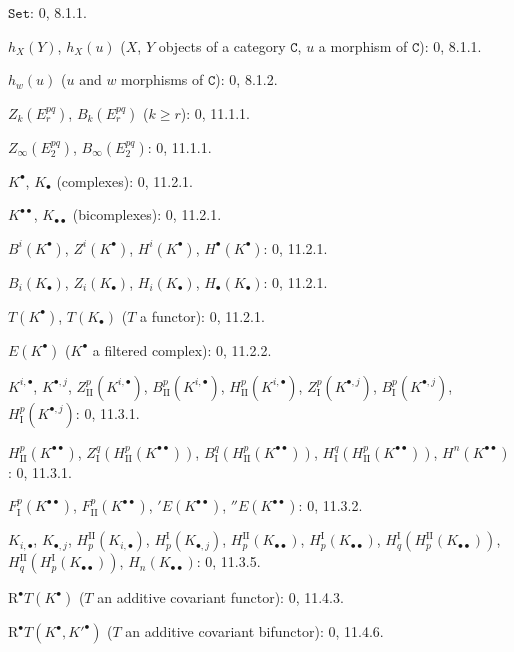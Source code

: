 \documentclass[oneside]{amsart}
\theoremstyle{ega-env-style}
\theoremstyle{ega-thm-env-style}
\theoremstyle{ega-defn-env-style}
\def\cat{\mathtt}                   %
\def\geq{\geqslant}                 %
\def\RR{\mathrm{R}}                 %
\def\C{\cat{C}}                     %
\def\Set{\cat{Set}}                 %
\begin{document}
\begin{flushleft}
$\Set$: 0, 8.1.1.

$h_X(Y)$, $h_X(u)$ ($X$, $Y$ objects of a category $\C$, $u$ a morphism
of $\C$): 0, 8.1.1.

$h_w(u)$ ($u$ and $w$ morphisms of $\C$): 0, 8.1.2.

$Z_k(E_r^{pq})$, $B_k(E_r^{pq})$ ($k\geq r$): 0, 11.1.1.

$Z_\infty(E_2^{pq})$, $B_\infty(E_2^{pq})$: 0, 11.1.1.

$K^\bullet$, $K_\bullet$ (complexes): 0, 11.2.1.

$K^{\bullet\bullet}$, $K_{\bullet\bullet}$ (bicomplexes): 0, 11.2.1.

$B^i(K^\bullet)$, $Z^i(K^\bullet)$, $H^i(K^\bullet)$,
$H^\bullet(K^\bullet)$: 0, 11.2.1.

$B_i(K_\bullet)$, $Z_i(K_\bullet)$, $H_i(K_\bullet)$,
$H_\bullet(K_\bullet)$: 0, 11.2.1.

$T(K^\bullet)$, $T(K_\bullet)$ ($T$ a functor): 0, 11.2.1.

$E(K^\bullet)$ ($K^\bullet$ a filtered complex): 0, 11.2.2.

$K^{i,\bullet}$, $K^{\bullet,j}$, $Z_{\mathrm{II}}^p(K^{i,\bullet})$,
$B_{\mathrm{II}}^p(K^{i,\bullet})$, $H_{\mathrm{II}}^p(K^{i,\bullet})$,
$Z_{\mathrm I}^p(K^{\bullet,j})$, $B_{\mathrm I}^p(K^{\bullet,j})$,
$H_{\mathrm I}^p(K^{\bullet,j})$: 0, 11.3.1.

$H_{\mathrm{II}}^p(K^{\bullet\bullet})$,
$Z_{\mathrm I}^q(H_{\mathrm{II}}^p(K^{\bullet\bullet}))$,
$B_{\mathrm I}^q(H_{\mathrm{II}}^p(K^{\bullet\bullet}))$,
$H_{\mathrm I}^q(H_{\mathrm{II}}^p(K^{\bullet\bullet}))$,
$H^n(K^{\bullet\bullet})$: 0, 11.3.1.

$F_{\mathrm I}^p(K^{\bullet\bullet})$,
$F_{\mathrm{II}}^p(K^{\bullet\bullet})$, ${}'E(K^{\bullet\bullet})$,
${}''E(K^{\bullet\bullet})$: 0, 11.3.2.

$K_{i,\bullet}$, $K_{\bullet,j}$, $H_p^{\mathrm{II}}(K_{i,\bullet})$,
$H_p^{\mathrm I}(K_{\bullet,j})$, $H_p^{\mathrm{II}}(K_{\bullet\bullet})$,
$H_p^{\mathrm I}(K_{\bullet\bullet})$,
$H_q^{\mathrm I}(H_p^{\mathrm{II}}(K_{\bullet\bullet}))$,
$H_q^{\mathrm{II}}(H_p^{\mathrm I}(K_{\bullet\bullet}))$,
$H_n(K_{\bullet\bullet})$: 0, 11.3.5.

$\RR^\bullet T(K^\bullet)$ ($T$ an additive covariant functor): 0, 11.4.3.

$\RR^\bullet T(K^\bullet,K'^{\bullet})$ ($T$ an additive covariant
bifunctor): 0, 11.4.6.


\end{flushleft}
\end{document}
